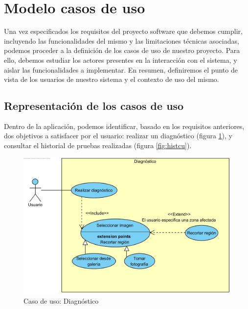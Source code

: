 \section{Modelo casos de uso}

Una vez especificados los requisitos del proyecto software que debemos cumplir, incluyendo las funcionalidades del mismo y las limitaciones técnicas asociadas, podemos proceder a la definición de los casos de uso de nuestro proyecto. Para ello, debemos estudiar los actores presentes en la interacción con el sistema, y aislar las funcionalidades a implementar. En resumen, definiremos el punto de vista de los usuarios de nuestro sistema y el contexto de uso del mismo.

 \subsection{Representación de los casos de uso}
 
 Dentro de la aplicación, podemos identificar, basado en los requisitos anteriores, dos objetivos a satisfacer por el usuario: realizar un diagnóstico (figura \ref{fig:diagcu}), y consultar el historial de pruebas realizadas (figura \ref{fig:histcu}).
 
 \begin{figure}[H]
 	\centering
 	\includegraphics[scale = 0.9]{imagenes/TomarFoto.png}
 	\caption{Caso de uso: Diagnóstico}
 	\label{fig:diagcu}
 \end{figure}
 
